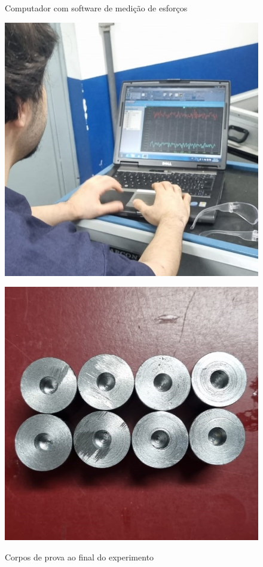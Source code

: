 \documentclass[deposito, acronym, symbols]{fei}
\begin{document}
\begin{figure}[!htp]
  \centering
  \begin{minipage}{0.6\textwidth}
    \centering
    \caption{Computador com software de medição de esforços}
    \includegraphics[width=1\linewidth]{Imagens/Exp04_computador.jpeg}
    \label{fig:comp}
  \end{minipage}
  \hfill
  \begin{minipage}{0.6\textwidth}
        \caption{Corpos de prova ao final do experimento}
    \includegraphics[width=1\linewidth]{Imagens/Exp04_blocos.jpeg}
    \label{fig:blocos}
  \end{minipage}
\end{figure}
\end{document}

